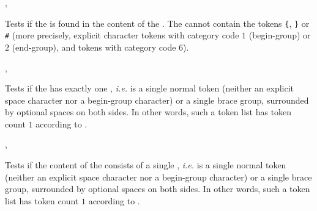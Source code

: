 \documentclass[oneside]{book}
\begin{document}
\begin{function}{\TlVarIfIn,\TlVarIfInTF}
\begin{syntax}
  
    
\end{syntax}
Tests if the  is found in the content of the
. The  cannot contain
the tokens \verb|{|, \verb|}| or \verb|#|
(more precisely, explicit character tokens with category code $1$
(begin-group) or $2$ (end-group), and tokens with category code $6$).
\begin{demohigh}
\TlSet {}
\TlVarIfInTF {} {} {}
\TlVarIfInTF {} {} {}
\end{demohigh}
\end{function}

\begin{function}{\TlIfSingle,\TlIfSingleTF}
\begin{syntax}
 
   
\end{syntax}
Tests if the  has exactly one , \emph{i.e.} is
a single normal token (neither an explicit space character nor a
begin-group character) or a single brace group, surrounded by
optional spaces on both sides. In other words, such a token list has
token count $1$ according to .
\begin{demohigh}
 {} {}
 {} {}
\end{demohigh}
\end{function}

\begin{function}{\TlVarIfSingle,\TlVarIfSingleTF}
\begin{syntax}
 
   
\end{syntax}
Tests if the content of the  consists of a single ,
\emph{i.e.} is a single normal token (neither an explicit space
character nor a begin-group character) or a single brace group,
surrounded by optional spaces on both sides. In other words, such a
token list has token count $1$ according to .
\begin{demohigh}
\TlSet {}
\TlVarIfSingleTF {} {}
\TlSet {}
\TlVarIfSingleTF {} {}
\end{demohigh}
\end{function}
\end{document}
